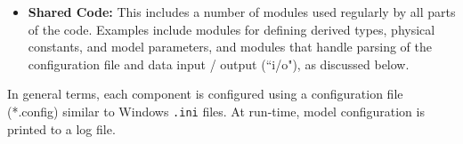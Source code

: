 \begin{itemize}
\item {\bf Shared Code:} This includes a number of modules used regularly 
by all parts of the code. Examples include modules for defining derived types, 
physical constants, and model parameters, and modules that handle parsing of 
the configuration file and data input / output (``i/o"), as discussed below.


\end{itemize}
%

%


In general terms, each component is configured using a configuration file (*.config) 
similar to Windows \texttt{.ini} files. At run-time, model configuration is printed
 to a log file. 

